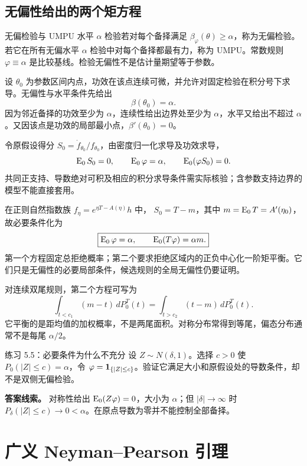 \subsection{无偏性给出的两个矩方程}

\begin{definitionbox}{无偏检验与 UMPU}
水平 $\alpha$ 检验若对每个备择满足 $\beta_\varphi(\theta)\ge\alpha$，称为无偏检验。若它在所有无偏水平 $\alpha$ 检验中对每个备择都最有力，称为 UMPU。常数规则 $\varphi\equiv\alpha$ 是比较基线。检验无偏性不是估计量期望等于参数。
\end{definitionbox}

设 $\theta_0$ 为参数区间内点，功效在该点连续可微，并允许对固定检验在积分号下求导。无偏性与水平条件先给出
\[
 \beta(\theta_0)=\alpha.
\]
因为邻近备择的功效至少为 $\alpha$，连续性给出边界处至少为 $\alpha$，水平又给出不超过 $\alpha$。又因该点是功效的局部最小点，$\beta'(\theta_0)=0$。

令原假设得分 $S_0=\dot f_{\theta_0}/f_{\theta_0}$，由密度归一化求导及功效求导，
\[
 \operatorname{E}_0S_0=0,\qquad
 \operatorname{E}_0\varphi=\alpha,\qquad \operatorname{E}_0(\varphi S_0)=0.
\]
共同正支持、导数绝对可积及相应的积分求导条件需实际核验；含参数支持边界的模型不能直接套用。

在正则自然指数族 $f_\eta=e^{\eta T-A(\eta)}h$ 中，
$S_0=T-m$，其中 $m=\operatorname{E}_0T=A'(\eta_0)$，故必要条件化为
\[
 \boxed{\operatorname{E}_0\varphi=\alpha,\qquad \operatorname{E}_0(T\varphi)=\alpha m.}
\]
第一个方程固定总拒绝概率；第二个要求拒绝区域内的正负中心化一阶矩平衡。它们只是无偏性的必要局部条件，候选规则的全局无偏性仍要证明。

对连续双尾规则，第二个方程可写为
\[
 \int_{t<c_1}(m-t)\,dP_0^T(t)
 =\int_{t>c_2}(t-m)\,dP_0^T(t).
\]
它平衡的是距均值的加权概率，不是两尾面积。对称分布常得到等尾，偏态分布通常不是每尾 $\alpha/2$。

\begin{examplebox}{练习 5.5：必要条件为什么不充分}
设 $Z\sim N(\delta,1)$。选择 $c>0$ 使 $P_0(|Z|\le c)=\alpha$，令 $\varphi=\mathbf 1_{\{|Z|\le c\}}$。验证它满足大小和原假设处的导数条件，却不是双侧无偏检验。

\textbf{答案线索。} 对称性给出 $\operatorname{E}_0(Z\varphi)=0$，大小为 $\alpha$；但 $|\delta|\to\infty$ 时 $P_\delta(|Z|\le c)\to0<\alpha$。在原点导数为零并不能控制全部备择。
\end{examplebox}

\section{广义 Neyman--Pearson 引理}

